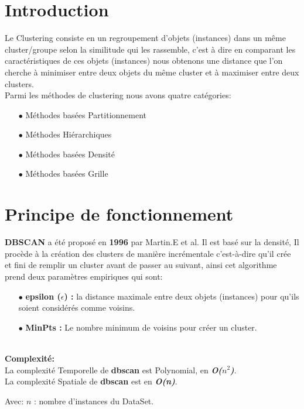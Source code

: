 \documentclass[12pt,a4paper,oneside]{book}
\begin{document}
	\section{Introduction}
	Le Clustering consiste en un regroupement d'objets (instances) dans un même cluster/groupe selon la similitude qui les rassemble, c'est à dire en comparant les caractéristiques de ces objets (instances) nous obtenons une distance que l'on cherche à minimiser entre deux objets du même cluster et à maximiser entre deux clusters.\\
	
	Parmi les méthodes de clustering nous avons quatre catégories: 
	\begin{itemize}
		\item[$\bullet$] Méthodes basées Partitionnement
		\item[$\bullet$] Méthodes Hiérarchiques
		\item[$\bullet$] Méthodes basées Densité
		\item[$\bullet$] Méthodes basées Grille
	\end{itemize}
	
	\section{Principe de fonctionnement}
	\textbf{DBSCAN} a été proposé en \textbf{1996} par Martin.E et al. Il est basé sur la densité, Il procède à la création des clusters de manière incrémentale c'est-à-dire qu'il crée et fini de remplir un cluster avant de passer au suivant, ainsi cet algorithme prend deux paramètres empiriques qui sont:
	\begin{itemize}
		\item[$\bullet$] \textbf{epsilon ($\epsilon$) :} la distance maximale entre deux objets (instances) pour qu'ils soient considérés comme voisins.
		\item[$\bullet$] \textbf{MinPts :} Le nombre minimum de voisins pour créer un cluster.
	\end{itemize}
	
	\textbf{ }\\
	\textbf{Complexité:}\\
	La complexité Temporelle de \textbf{dbscan} est Polynomial,  en \textbf{\textit{O($n^2$)}}.\\
	La complexité Spatiale  de \textbf{dbscan} est en \textbf{\textit{O(n)}}.
	
	
	Avec: $n$ : nombre d'instances du DataSet.
	
	
	
\end{document}
